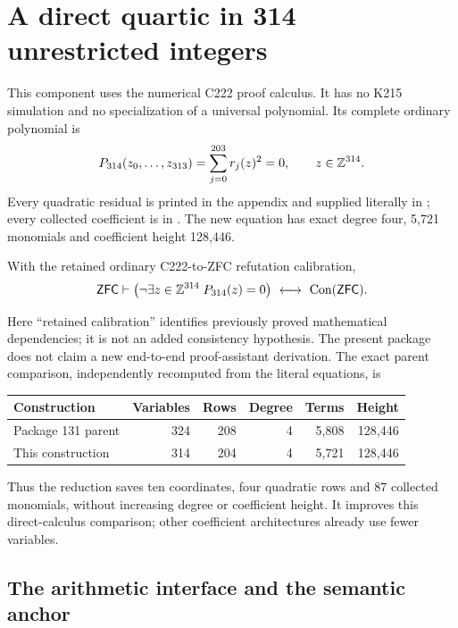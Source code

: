 \section{A direct quartic in 314 unrestricted integers}
\label{sec:direct314}

This component uses the numerical C222 proof calculus. It has no K215
simulation and no specialization of a universal polynomial. Its complete
ordinary polynomial is
\begin{equation}\label{eq:direct314}
 P_{314}(z_0,\ldots,z_{313})=\sum_{j=0}^{203}r_j(z)^2=0,
 \qquad z\in\mathbb Z^{314}.
\end{equation}
Every quadratic residual is printed in the appendix and supplied literally
in ; every collected coefficient is in
. The new equation has exact degree
four, 5,721 monomials and coefficient height 128,446.

\begin{theorem}\label{thm:direct314}
With the retained ordinary C222-to-ZFC refutation calibration,
\[
 \mathsf{ZFC}\vdash
 \bigl(\neg\exists z\in\mathbb Z^{314}\;P_{314}(z)=0\bigr)
 \ \longleftrightarrow\ \operatorname{Con}(\mathsf{ZFC}).
\]
\end{theorem}

Here ``retained calibration'' identifies previously proved mathematical
dependencies; it is not an added consistency hypothesis. The present
package does not claim a new end-to-end proof-assistant derivation.
The exact parent comparison, independently recomputed from the literal
equations, is
\begin{center}
\begin{tabular}{lrrrrr}
\toprule
Construction & Variables & Rows & Degree & Terms & Height\\
\midrule
Package 131 parent &324&208&4&5,808&128,446\\
This construction &314&204&4&5,721&128,446\\
\bottomrule
\end{tabular}
\end{center}
Thus the reduction saves ten coordinates, four quadratic rows and 87
collected monomials, without increasing degree or coefficient height.
It improves this direct-calculus comparison; other coefficient
architectures already use fewer variables.

\subsection{The arithmetic interface and the semantic anchor}

